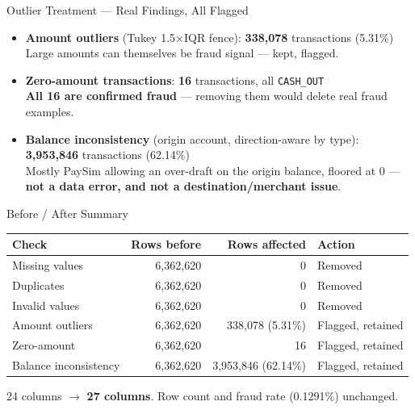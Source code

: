 \documentclass[aspectratio=169]{beamer}
\begin{document}
\begin{frame}{Outlier Treatment --- Real Findings, All Flagged}
\begin{itemize}
    \item \textbf{Amount outliers} (Tukey 1.5\(\times\)IQR fence): \textbf{338,078} transactions (5.31\%)\\
    \small Large amounts can themselves be fraud signal --- kept, flagged.
    \vspace{0.2cm}
    \item \textbf{Zero-amount transactions}: \textbf{16} transactions, all \texttt{CASH\_OUT}\\
    \small \textbf{All 16 are confirmed fraud} --- removing them would delete real fraud examples.
    \vspace{0.2cm}
    \item \textbf{Balance inconsistency} (origin account, direction-aware by type): \textbf{3,953,846} transactions (62.14\%)\\
    \small Mostly PaySim allowing an over-draft on the origin balance, floored at 0 --- \textbf{not a data error, and not a destination/merchant issue}.
\end{itemize}
\end{frame}

\begin{frame}{Before / After Summary}
\centering\scriptsize
\begin{tabular}{@{}lrrl@{}}
\toprule
\textbf{Check} & \textbf{Rows before} & \textbf{Rows affected} & \textbf{Action} \\
\midrule
Missing values & 6,362,620 & 0 & Removed \\
Duplicates & 6,362,620 & 0 & Removed \\
Invalid values & 6,362,620 & 0 & Removed \\
Amount outliers & 6,362,620 & 338,078 (5.31\%) & Flagged, retained \\
Zero-amount & 6,362,620 & 16 & Flagged, retained \\
Balance inconsistency & 6,362,620 & 3,953,846 (62.14\%) & Flagged, retained \\
\bottomrule
\end{tabular}
\vspace{0.4cm}
\begin{center}
24 columns \(\rightarrow\) \textbf{27 columns}. Row count and fraud rate (0.1291\%) unchanged.
\end{center}
\end{frame}
\end{document}
